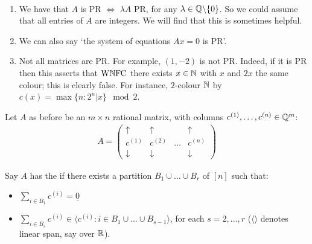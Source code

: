 \documentclass[10pt]{article}
\newcommand{\wnfc}{\textrm{W}\N\textrm{FC}}
\begin{document}
\begin{remark*}[Notes]\ 
    \begin{enumerate}
        \item We have that $A$ is PR $\iff$ $\lambda A$ PR, for any $\lambda \in \mathbb{Q} \backslash \{0\}$. So we could assume that all entries of $A$ are integers. We will find that this is sometimes helpful.
        \item We can also say `the system of equations $Ax = 0$ is PR'.
        \item Not all matrices are PR. For example, $(1,-2)$ is not PR. Indeed, if it is PR then this asserts that $\wnfc$ there exists $x\in \mathbb{N}$ with $x$ and $2x$ the same colour; this is clearly false. For instance, $2$-colour $\mathbb{N}$ by $c(x) = \max\{n:2^n |x\} \mod 2$.
    \end{enumerate}
\end{remark*}

\begin{defin*}
    Let $A$ as before be an $m\times n$ rational matrix, with columns $c^{(1)},\dots,c^{(n)}\in\mathbb{Q}^m$:
    \begin{align*}
        A = \left( \begin{array}{cccc}
            \uparrow & \uparrow & & \uparrow\\
            c^{(1)} & c^{(2)} & \dots & c^{(n)}\\
            \downarrow & \downarrow & & \downarrow
        \end{array}\right)
    \end{align*}

    Say $A$ has the  if there exists a partition $B_1\cup\dots\cup B_r$ of $[n]$ such that:
    \begin{itemize}
        \item $\sum_{i\in B_1}c^{(i)} = \underline{0}$
        \item $\sum_{i\in B_s}c^{(i)} \in \langle c^{(i)} : i \in B_1\cup\dots \cup B_{s-1}\rangle$, for each $s = 2,\dots,r$ ($\langle \rangle$ denotes linear span, say over $\mathbb{R}$).
    \end{itemize}
\end{defin*}
\end{document}
